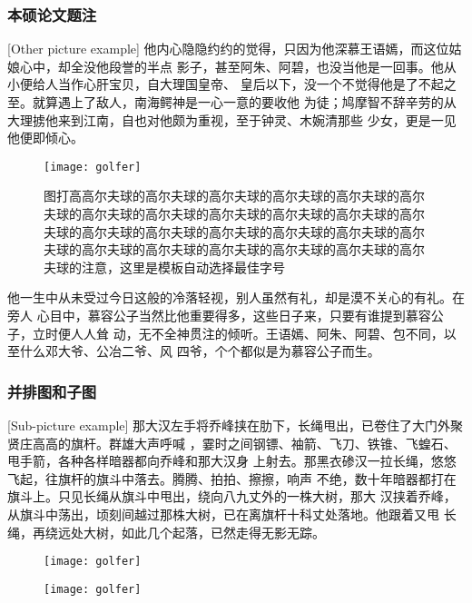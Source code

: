 \subsubsection{本硕论文题注}[Other picture example]
他内心隐隐约约的觉得，只因为他深慕王语嫣，而这位姑娘心中，却全没他段誉的半点
影子，甚至阿朱、阿碧，也没当他是一回事。他从小便给人当作心肝宝贝，自大理国皇帝、
皇后以下，没一个不觉得他是了不起之至。就算遇上了敌人，南海鳄神是一心一意的要收他
为徒；鸠摩智不辞辛劳的从大理掳他来到江南，自也对他颇为重视，至于钟灵、木婉清那些
少女，更是一见他便即倾心。
\begin{figure}[h]
\centering
\texttt{[image: golfer]}
\caption{图打高高尔夫球的高尔夫球的高尔夫球的高尔夫球的高尔夫球的高尔夫球的高尔夫球的高尔夫球的高尔夫球的高尔夫球的高尔夫球的高尔夫球的高尔夫球的高尔夫球的高尔夫球的高尔夫球的高尔夫球的高尔夫球的高尔夫球的高尔夫球的高尔夫球的高尔夫球的高尔夫球的高尔夫球的注意，这里是模板自动选择最佳字号}
\end{figure}
他一生中从未受过今日这般的冷落轻视，别人虽然有礼，却是漠不关心的有礼。在旁人
心目中，慕容公子当然比他重要得多，这些日子来，只要有谁提到慕容公子，立时便人人耸
动，无不全神贯注的倾听。王语嫣、阿朱、阿碧、包不同，以至什么邓大爷、公冶二爷、风
四爷，个个都似是为慕容公子而生。

\subsubsection{并排图和子图}[Sub-picture example]
那大汉左手将乔峰挟在肋下，长绳甩出，已卷住了大门外聚贤庄高高的旗杆。群雄大声呼喊
，霎时之间钢镖、袖箭、飞刀、铁锥、飞蝗石、甩手箭，各种各样暗器都向乔峰和那大汉身
上射去。那黑衣碜汉一拉长绳，悠悠飞起，往旗杆的旗斗中落去。腾腾、拍拍、擦擦，响声
不绝，数十年暗器都打在旗斗上。只见长绳从旗斗中甩出，绕向八九丈外的一株大树，那大
汉挟着乔峰，从旗斗中荡出，顷刻间越过那株大树，已在离旗杆十科丈处落地。他跟着又甩
长绳，再绕远处大树，如此几个起落，已然走得无影无踪。

\begin{figure}[htbp]
\centering
\begin{minipage}{0.4\textwidth}
\centering
\texttt{[image: golfer]}
\end{minipage}
\begin{minipage}{0.4\textwidth}
\centering
\texttt{[image: golfer]}
\end{minipage}
\end{figure}

